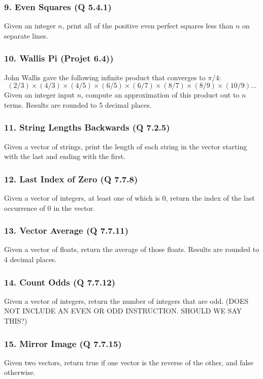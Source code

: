 \documentclass{sig-alternate}
\begin{document}
\subsubsection*{9. Even Squares (Q 5.4.1)}
Given an integer $n$, print all of the positive even perfect squares less than $n$ on separate lines.

\subsubsection*{10. Wallis Pi (Projet 6.4))}
John Wallis gave the following infinite product that converges to $\pi/4$:
\[
(2/3)\times(4/3)\times(4/5)\times(6/5)\times(6/7)\times(8/7)\times(8/9)\times(10/9)...
\]
Given an integer input $n$, compute an approximation of this product out to $n$ terms. Results are rounded to 5 decimal places.

\subsubsection*{11. String Lengths Backwards (Q 7.2.5)}
Given a vector of strings, print the length of each string in the vector starting with the last and ending with the first.

\subsubsection*{12. Last Index of Zero (Q 7.7.8)}
Given a vector of integers, at least one of which is 0, return the index of the last occurrence of 0 in the vector.

\subsubsection*{13. Vector Average (Q 7.7.11)}
Given a vector of floats, return the average of those floats. Results are rounded to 4 decimal places.

\subsubsection*{14. Count Odds (Q 7.7.12)}
Given a vector of integers, return the number of integers that are odd. (DOES NOT INCLUDE AN EVEN OR ODD INSTRUCTION. SHOULD WE SAY THIS?)

\subsubsection*{15. Mirror Image (Q 7.7.15)}
Given two vectors, return true if one vector is the reverse of the other, and false otherwise.
\end{document}
